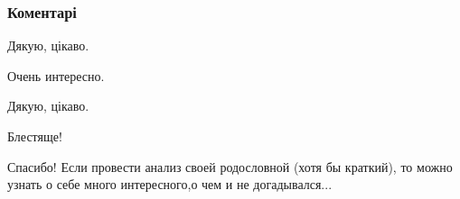  
 
 
 
 
\subsubsection{Коментарі}

\begin{itemize}
 
Дякую, цікаво.

 
Очень интересно.

 
Дякую, цікаво.

 
Блестяще!

 
Спасибо! Если провести анализ своей родословной (хотя бы краткий), то можно узнать о себе много интересного,о чем и не догадывался...


\end{itemize}
